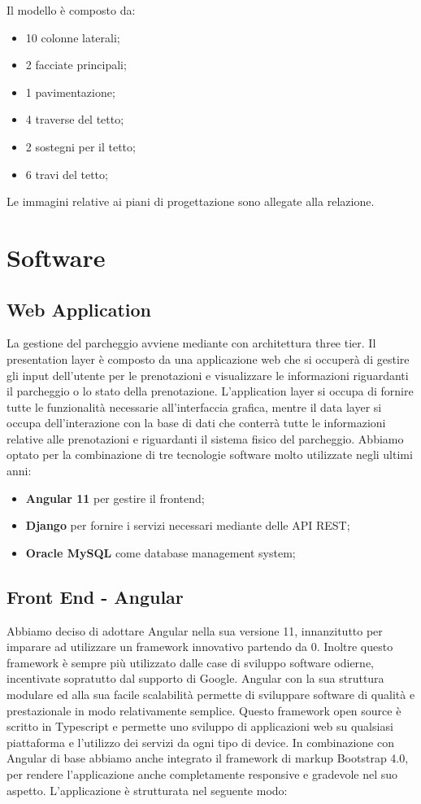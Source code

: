 \documentclass[a4paper,11pt]{report}
\begin{document}
Il modello è composto da:
\begin{itemize}
	\item 10 colonne laterali;
	\item 2 facciate principali;
	\item 1 pavimentazione;
	\item 4 traverse del tetto;
	\item 2 sostegni per il tetto;
	\item 6 travi del tetto;
\end{itemize}
Le immagini relative ai piani di progettazione sono allegate alla relazione.

\chapter{Software}
\section{Web Application}
La gestione del parcheggio avviene mediante con architettura three tier. Il presentation layer è composto da una applicazione web che si occuperà di gestire gli input dell'utente per le prenotazioni e visualizzare le informazioni riguardanti il parcheggio o lo stato della prenotazione.
L'application layer si occupa di fornire tutte le funzionalità necessarie all'interfaccia grafica, mentre il data layer si occupa dell'interazione con la base di dati che conterrà tutte le informazioni relative alle prenotazioni e riguardanti il sistema fisico del parcheggio.
\newline Abbiamo optato per la combinazione di tre tecnologie software molto utilizzate negli ultimi anni:
\begin{itemize}
	\item \textbf{Angular 11} per gestire il frontend;
	\item \textbf{Django} per fornire i servizi necessari mediante delle API REST;
	\item \textbf{Oracle MySQL} come database management system;
\end{itemize}
\section{Front End - Angular}
Abbiamo deciso di adottare Angular nella sua versione 11, innanzitutto per imparare ad utilizzare un framework innovativo partendo da 0. Inoltre questo framework è sempre più utilizzato dalle case di sviluppo software odierne, incentivate sopratutto dal supporto di Google. \newline
Angular con la sua struttura modulare ed alla sua facile scalabilità permette di sviluppare software di qualità e prestazionale in modo relativamente semplice.
Questo framework open source è scritto in Typescript e permette uno sviluppo di applicazioni web su qualsiasi piattaforma e l'utilizzo dei servizi da ogni tipo di device. \newline
In combinazione con Angular di base abbiamo anche integrato il framework di markup Bootstrap 4.0, per rendere l'applicazione anche completamente responsive e gradevole nel suo aspetto. \newline
L'applicazione è strutturata nel seguente modo:
\newpage
\end{document}
